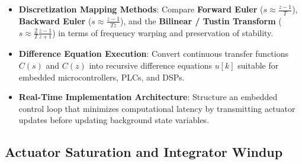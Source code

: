 \documentclass[12pt,onecolumn,twoside ]{article}
\begin{document}
\begin{itemize}
		\item[$\square$]
		\textbf{Discretization Mapping Methods}: Compare \textbf{Forward Euler} ($s \approx \frac{z-1}{T}$), \textbf{Backward Euler} ($s \approx \frac{z-1}{Tz}$), and the \textbf{Bilinear / Tustin Transform} ($s \approx \frac{2}{T}\frac{z-1}{z+1}$) in terms of frequency warping and preservation of stability.
		\item[$\square$]
		\textbf{Difference Equation Execution}: Convert continuous transfer functions $C(s)$ and $C(z)$ into recursive difference equations $u[k]$ suitable for embedded microcontrollers, PLCs, and DSPs.
		\item[$\square$]
		\textbf{Real-Time Implementation Architecture}: Structure an embedded control loop that minimizes computational latency by transmitting actuator updates before updating background state variables.
	\end{itemize}
	
	\subsection{Actuator Saturation and Integrator Windup}
\end{document}
